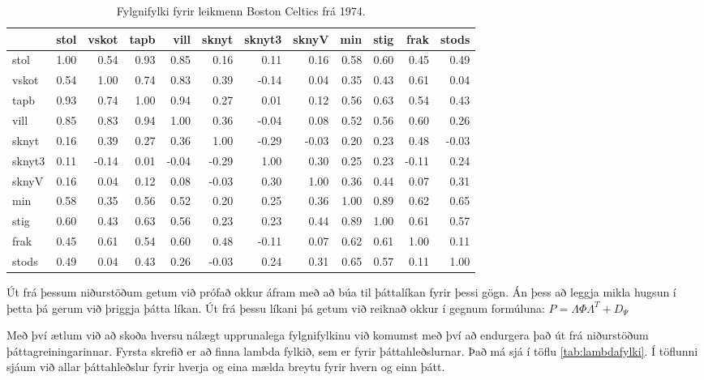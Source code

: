 \documentclass[]{book}
\begin{document}
\begin{table}

\caption{\label{tab:BCfylgni}Fylgnifylki fyrir leikmenn Boston Celtics frá 1974.}
\centering
\begin{tabular}[t]{l|r|r|r|r|r|r|r|r|r|r|r}
\hline
  & stol & vskot & tapb & vill & sknyt & sknyt3 & sknyV & min & stig & frak & stods\\
\hline
stol & 1.00 & 0.54 & 0.93 & 0.85 & 0.16 & 0.11 & 0.16 & 0.58 & 0.60 & 0.45 & 0.49\\
\hline
vskot & 0.54 & 1.00 & 0.74 & 0.83 & 0.39 & -0.14 & 0.04 & 0.35 & 0.43 & 0.61 & 0.04\\
\hline
tapb & 0.93 & 0.74 & 1.00 & 0.94 & 0.27 & 0.01 & 0.12 & 0.56 & 0.63 & 0.54 & 0.43\\
\hline
vill & 0.85 & 0.83 & 0.94 & 1.00 & 0.36 & -0.04 & 0.08 & 0.52 & 0.56 & 0.60 & 0.26\\
\hline
sknyt & 0.16 & 0.39 & 0.27 & 0.36 & 1.00 & -0.29 & -0.03 & 0.20 & 0.23 & 0.48 & -0.03\\
\hline
sknyt3 & 0.11 & -0.14 & 0.01 & -0.04 & -0.29 & 1.00 & 0.30 & 0.25 & 0.23 & -0.11 & 0.24\\
\hline
sknyV & 0.16 & 0.04 & 0.12 & 0.08 & -0.03 & 0.30 & 1.00 & 0.36 & 0.44 & 0.07 & 0.31\\
\hline
min & 0.58 & 0.35 & 0.56 & 0.52 & 0.20 & 0.25 & 0.36 & 1.00 & 0.89 & 0.62 & 0.65\\
\hline
stig & 0.60 & 0.43 & 0.63 & 0.56 & 0.23 & 0.23 & 0.44 & 0.89 & 1.00 & 0.61 & 0.57\\
\hline
frak & 0.45 & 0.61 & 0.54 & 0.60 & 0.48 & -0.11 & 0.07 & 0.62 & 0.61 & 1.00 & 0.11\\
\hline
stods & 0.49 & 0.04 & 0.43 & 0.26 & -0.03 & 0.24 & 0.31 & 0.65 & 0.57 & 0.11 & 1.00\\
\hline
\end{tabular}
\end{table}

Út frá þessum niðurstöðum getum við prófað okkur áfram með að búa til þáttalíkan fyrir þessi gögn. Án þess að leggja mikla hugsun í þetta þá gerum við þriggja þátta líkan. Út frá þessu líkani þá getum við reiknað okkur í gegnum formúluna: \(P = \Lambda \Phi \Lambda^{T}+D_{\Psi}\)

Með því ætlum við að skoða hversu nálægt upprunalega fylgnifylkinu við komumst með því að endurgera það út frá niðurstöðum þáttagreiningarinnar. Fyrsta skrefið er að finna lambda fylkið, sem er fyrir þáttahleðslurnar. Það má sjá í töflu \ref{tab:lambdafylki}. Í töflunni sjáum við allar þáttahleðslur fyrir hverja og eina mælda breytu fyrir hvern og einn þátt.
\end{document}
